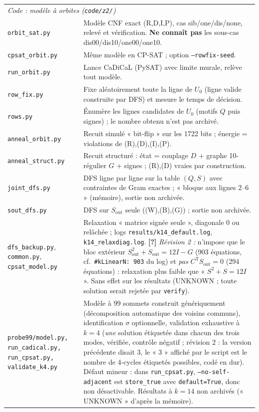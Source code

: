 \documentclass[11pt,a4paper]{article}
\theoremstyle{definition}
\theoremstyle{remark}
\newcommand{\Sout}{S_{\mathrm{out}}}
\newcommand{\st}[1]{\textbf{[#1]}}
\newcommand{\code}[1]{\texttt{#1}}
\begin{document}
\begin{longtable}{p{5.2cm}p{9.6cm}}
\multicolumn{2}{l}{\emph{Code : modèle à orbites (\code{code/z2/})}}\\
\code{orbit\_sat.py} & Modèle CNF exact (R,D,I,P), cas sib/one/dis/none, relevé et vérification. \textbf{Ne connaît pas} les sous-cas dis00/dis10/one00/one10.\\
\code{cpsat\_orbit.py} & Même modèle en CP-SAT ; option \code{--rowfix-seed}.\\
\code{run\_orbit.py} & Lance CaDiCaL (PySAT) avec limite murale, relève tout modèle.\\
\code{row\_fix.py} & Fixe aléatoirement toute la ligne de $U_0$ (ligne valide construite par DFS) et mesure le temps de décision.\\
\code{rows.py} & Énumère les lignes candidates de $U_0$ (motifs $Q$ puis signes) ; le nombre obtenu n'est pas archivé.\\
\code{anneal\_orbit.py} & Recuit simulé « bit-flip » sur les 1722 bits ; énergie = violations de (R),(D),(I),(P).\\
\code{anneal\_struct.py} & Recuit structuré : état = couplage $D$ + graphe 10-régulier $G$ + signes ; (R),(D) vraies par construction.\\
\code{joint\_dfs.py} & DFS ligne par ligne sur la table $(Q,S)$ avec contraintes de Gram exactes ; « bloque aux lignes 2--6 » (mémoire), sortie non archivée.\\
\code{sout\_dfs.py} & DFS sur $\Sout$ seule ((W),(B),(G)) ; sortie non archivée.\\
\code{dfs\_backup.py}, \code{common.py}, \code{cpsat\_model.py} & Relaxation « matrice signée seule », diagonale $0$ ou relâchée ; logs \code{results/k14\_default.log}, \code{k14\_relaxdiag.log}. \st{?} \emph{Révision 2 :} n'impose que le bloc extérieur $\Sout^2+\Sout=12I-G$ (903 équations, cf.\ \code{\#kLinearN: 903} du log) et \emph{pas} $C^{\mathsf T}\Sout=0$ (294 équations) : relaxation plus faible que « $S^2+S=12I$ ». Sans effet sur les résultats (UNKNOWN ; toute solution serait rejetée par \code{verify}).\\
\code{probe99/model.py, run\_cadical.py, run\_cpsat.py, validate\_k4.py} & Modèle à 99 sommets construit génériquement (décomposition automatique des voisins communs), identification $\sigma$ optionnelle, validation exhaustive à $k=4$ (\emph{une} solution étiquetée dans chacun des trois modes, vérifiée, contrôle négatif ; révision 2 : la version précédente disait 3, le « 3 » affiché par le script est le nombre de 4-cycles étiquetés possibles, codé en dur). Défaut mineur : dans \code{run\_cpsat.py}, \code{--no-self-adjacent} est \code{store\_true} avec \code{default=True}, donc non désactivable. Résultats à $k=14$ non archivés (« UNKNOWN » d'après la mémoire).\\

\end{longtable}
\end{document}
